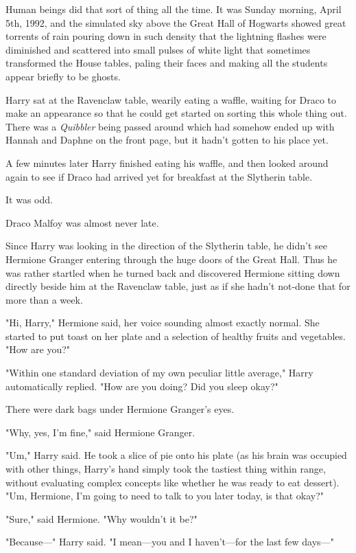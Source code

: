Human beings did that sort of thing all the time.
\sbreak
It was Sunday morning, April 5th, 1992, and the simulated sky above
the Great Hall of Hogwarts showed great torrents of rain pouring down in such
density that the lightning flashes were diminished and scattered into small
pulses of white light that sometimes transformed the House tables, paling their
faces and making all the students appear briefly to be ghosts.

Harry sat at the Ravenclaw table, wearily eating a waffle, waiting for Draco to
make an appearance so that he could get started on sorting this whole thing
out. There was a \emph{Quibbler} being passed around which had somehow ended up
with Hannah and Daphne on the front page, but it hadn't gotten to his place yet.

A few minutes later Harry finished eating his waffle, and then looked around
again to see if Draco had arrived yet for breakfast at the Slytherin table.

It was odd.

Draco Malfoy was almost never late.

Since Harry was looking in the direction of the Slytherin table, he didn't see
Hermione Granger entering through the huge doors of the Great Hall. Thus he was
rather startled when he turned back and discovered Hermione sitting down
directly beside him at the Ravenclaw table, just as if she hadn't not-done that
for more than a week.

"Hi, Harry," Hermione said, her voice sounding almost exactly normal. She
started to put toast on her plate and a selection of healthy fruits and
vegetables. "How are you?"

"Within one standard deviation of my own peculiar little average," Harry
automatically replied. "How are you doing? Did you sleep okay?"

There were dark bags under Hermione Granger's eyes.

"Why, yes, I'm fine," said Hermione Granger.

"Um," Harry said. He took a slice of pie onto his plate (as his brain was
occupied with other things, Harry's hand simply took the tastiest thing within
range, without evaluating complex concepts like whether he was ready to eat
dessert). "Um, Hermione, I'm going to need to talk to you later today, is that
okay?"

"Sure," said Hermione. "Why wouldn't it be?"

"Because—" Harry said. "I mean—you and I haven't—for the last few days—"

